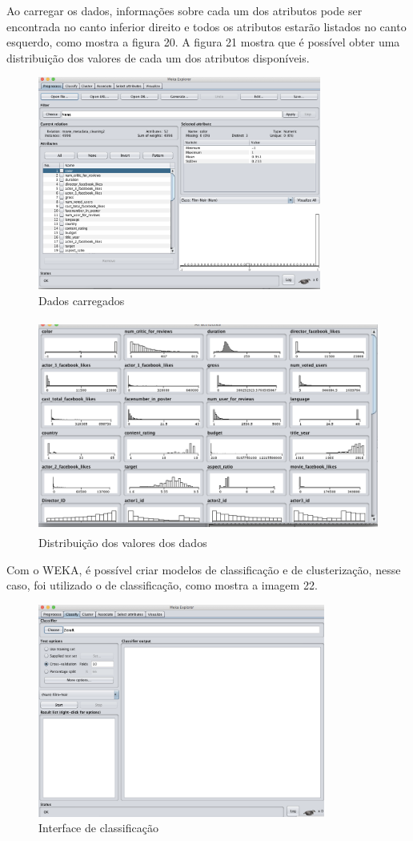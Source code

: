 Ao carregar os dados, informações sobre cada um dos atributos pode ser encontrada no canto inferior direito e todos os atributos estarão listados no canto esquerdo, como mostra a figura 20. A figura 21 mostra que é possível obter uma distribuição dos valores de cada um dos atributos disponíveis.

\begin{figure}[H]
\centering
\includegraphics[height=7cm]{imagens/wekapreprocessingfull.png}
\caption{Dados carregados}
\label{figura20}
\end{figure}

\begin{figure}[H]
\centering
\includegraphics[height=7cm]{imagens/wekadistribuition.png}
\caption{Distribuição dos valores dos dados}
\label{figura21}
\end{figure}

Com o WEKA, é possível criar modelos de classificação e de clusterização, nesse caso, foi utilizado o de classificação, como mostra a imagem 22. 

\begin{figure}[H]
\centering
\includegraphics[height=7cm]{imagens/weka.png}
\caption{Interface de classificação}
\label{figura22}
\end{figure}

